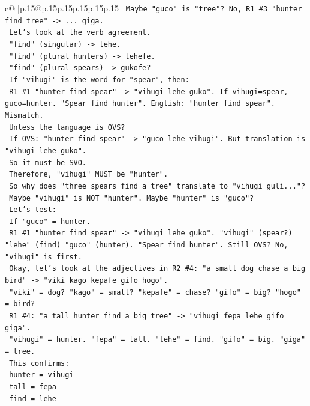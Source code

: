 \documentclass{article}
\begin{document}
{\begin{supertabular}{c@{$\;$}|p{.15\linewidth}@{}p{.15\linewidth}p{.15\linewidth}p{.15\linewidth}p{.15\linewidth}p{.15\linewidth}}
{{{\texttt{   Maybe "guco" is "tree"? No, R1 \#3 "hunter find tree" {-}> ... giga.} \\
\texttt{   Let's look at the verb agreement.} \\
\texttt{   "find" (singular) {-}> lehe.} \\
\texttt{   "find" (plural hunters) {-}> lehefe.} \\
\texttt{   "find" (plural spears) {-}> gukofe?} \\
\texttt{   If "vihugi" is the word for "spear", then:} \\
\texttt{   R1 \#1 "hunter find spear" {-}> "vihugi lehe guko". If vihugi=spear, guco=hunter. "Spear find hunter". English: "hunter find spear". Mismatch.} \\
\texttt{   Unless the language is OVS?} \\
\texttt{   If OVS: "hunter find spear" {-}> "guco lehe vihugi". But translation is "vihugi lehe guko".} \\
\texttt{   So it must be SVO.} \\
\texttt{   Therefore, "vihugi" MUST be "hunter".} \\
\texttt{   So why does "three spears find a tree" translate to "vihugi guli..."?} \\
\texttt{   Maybe "vihugi" is NOT "hunter". Maybe "hunter" is "guco"?} \\
\texttt{   Let's test:} \\
\texttt{   If "guco" = hunter.} \\
\texttt{   R1 \#1 "hunter find spear" {-}> "vihugi lehe guko". "vihugi" (spear?) "lehe" (find) "guco" (hunter). "Spear find hunter". Still OVS? No, "vihugi" is first.} \\
\texttt{   Okay, let's look at the adjectives in R2 \#4: "a small dog chase a big bird" {-}> "viki kago kepafe gifo hogo".} \\
\texttt{   "viki" = dog? "kago" = small? "kepafe" = chase? "gifo" = big? "hogo" = bird?} \\
\texttt{   R1 \#4: "a tall hunter find a big tree" {-}> "vihugi fepa lehe gifo giga".} \\
\texttt{   "vihugi" = hunter. "fepa" = tall. "lehe" = find. "gifo" = big. "giga" = tree.} \\
\texttt{   This confirms:} \\
\texttt{   hunter = vihugi} \\
\texttt{   tall = fepa} \\
\texttt{   find = lehe} \\
}}}
\end{supertabular}}
\end{document}

